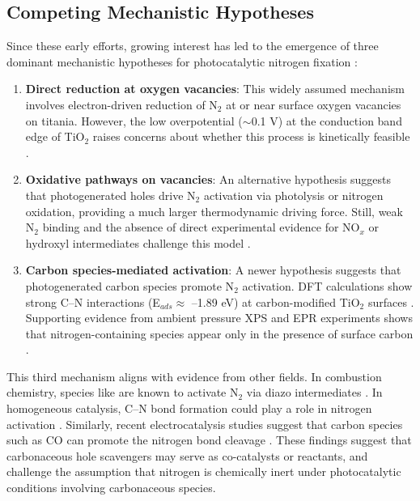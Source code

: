 \subsection{Competing Mechanistic Hypotheses}

Since these early efforts, growing interest has led to the emergence of three dominant mechanistic hypotheses for photocatalytic nitrogen fixation \cite{Medford_2017, Hirakawa_2017, cao2019photocatalytic, hu2016effect, zhao2019tuning, jia2019site}:

\begin{enumerate}
  \item \textbf{Direct reduction at oxygen vacancies}: This widely assumed mechanism involves electron-driven reduction of N$_2$ at or near surface oxygen vacancies on titania. However, the low overpotential ($\sim$0.1 V) at the conduction band edge of TiO$_2$ raises concerns about whether this process is kinetically feasible \cite{Hirakawa_2017, cao2019photocatalytic, hu2016effect, zhao2019tuning, jia2019site}.
  \item \textbf{Oxidative pathways on vacancies}: An alternative hypothesis suggests that photogenerated holes drive N$_2$ activation via photolysis or nitrogen oxidation, providing a much larger thermodynamic driving force. Still, weak N$_2$ binding and the absence of direct experimental evidence for NO$_x$ or hydroxyl intermediates challenge this model \cite{Comer_2018}.
  \item \textbf{Carbon species-mediated activation}: A newer hypothesis suggests that photogenerated carbon species promote N$_2$ activation. DFT calculations show strong C–N interactions (E$_{ads} \approx$ –1.89 eV) at carbon-modified TiO$_2$ surfaces \cite{comer2018role}. Supporting evidence from ambient pressure XPS and EPR experiments shows that nitrogen-containing species appear only in the presence of surface carbon \cite{comer2018role, Liu2019}.
\end{enumerate}

This third mechanism aligns with evidence from other fields. In combustion chemistry, species like  are known to activate N$_2$ via diazo intermediates \cite{glarborg2018modeling}. In homogeneous catalysis, C–N bond formation could play a role in nitrogen activation \cite{lv2020direct}. Similarly, recent electrocatalysis studies suggest that carbon species such as CO can promote the nitrogen bond cleavage \cite{chen2020coupling, huang2021direct}. These findings suggest that carbonaceous hole scavengers may serve as co-catalysts or reactants, and challenge the assumption that nitrogen is chemically inert under photocatalytic conditions involving carbonaceous species.

